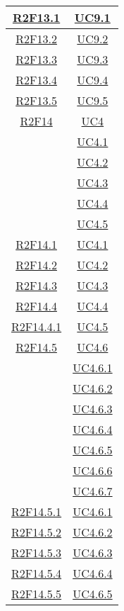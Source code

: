 \begin{longtable}{|c|c|}
\hline
\hyperlink{R2F13.1}{R2F13.1} & \hyperlink{UC9.1}{UC9.1}\\
\hline
\hyperlink{R2F13.2}{R2F13.2} & \hyperlink{UC9.2}{UC9.2}\\
\hline
\hyperlink{R2F13.3}{R2F13.3} & \hyperlink{UC9.3}{UC9.3}\\
\hline
\hyperlink{R2F13.4}{R2F13.4} & \hyperlink{UC9.4}{UC9.4}\\
\hline
\hyperlink{R2F13.5}{R2F13.5} & \hyperlink{UC9.5}{UC9.5}\\
\hline
\hyperlink{R2F14}{R2F14} & \hyperlink{UC4}{UC4}\\
& \hyperlink{UC4.1}{UC4.1}\\
& \hyperlink{UC4.2}{UC4.2}\\
& \hyperlink{UC4.3}{UC4.3}\\
& \hyperlink{UC4.4}{UC4.4}\\
& \hyperlink{UC4.5}{UC4.5}\\
\hline
\hyperlink{R2F14.1}{R2F14.1} & \hyperlink{UC4.1}{UC4.1}\\
\hline
\hyperlink{R2F14.2}{R2F14.2} & \hyperlink{UC4.2}{UC4.2}\\
\hline
\hyperlink{R2F14.3}{R2F14.3} & \hyperlink{UC4.3}{UC4.3}\\
\hline
\hyperlink{R2F14.4}{R2F14.4} & \hyperlink{UC4.4}{UC4.4}\\
\hline
\hyperlink{R2F14.4.1}{R2F14.4.1} & \hyperlink{UC4.5}{UC4.5}\\
\hline
\hyperlink{R2F14.5}{R2F14.5} & \hyperlink{UC4.6}{UC4.6}\\
& \hyperlink{UC4.6.1}{UC4.6.1}\\
& \hyperlink{UC4.6.2}{UC4.6.2}\\
& \hyperlink{UC4.6.3}{UC4.6.3}\\
& \hyperlink{UC4.6.4}{UC4.6.4}\\
& \hyperlink{UC4.6.5}{UC4.6.5}\\
& \hyperlink{UC4.6.6}{UC4.6.6}\\
& \hyperlink{UC4.6.7}{UC4.6.7}\\
\hline
\hyperlink{R2F14.5.1}{R2F14.5.1} & \hyperlink{UC4.6.1}{UC4.6.1}\\
\hline
\hyperlink{R2F14.5.2}{R2F14.5.2} & \hyperlink{UC4.6.2}{UC4.6.2}\\
\hline
\hyperlink{R2F14.5.3}{R2F14.5.3} & \hyperlink{UC4.6.3}{UC4.6.3}\\
\hline
\hyperlink{R2F14.5.4}{R2F14.5.4} & \hyperlink{UC4.6.4}{UC4.6.4}\\
\hline
\hyperlink{R2F14.5.5}{R2F14.5.5} & \hyperlink{UC4.6.5}{UC4.6.5}\\

\end{longtable}
